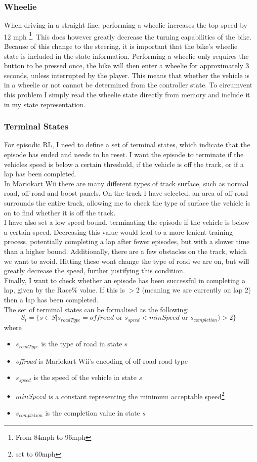 \subsubsection{Wheelie}
When driving in a straight line, performing a wheelie increases the top speed by 12 mph \footnote{From 84mph to 96mph}. This does however greatly decrease the turning capabilities of the bike. Because of this change to the steering, it is important that the bike's wheelie state is included in the state information. Performing a wheelie only requires the button to be pressed once, the bike will then enter a wheelie for approximately 3 seconds, unless interrupted by the player. This means that whether the vehicle is in a wheelie or not cannot be determined from the controller state. To circumvent this problem I simply read the wheelie state directly from memory and include it in my state representation.
\subsubsection{Terminal States}
\label{sec:terminal-states}
For episodic RL, I need to define a set of terminal states, which indicate that the episode has ended and needs to be reset. I want the episode to terminate if the vehicles speed is below a certain threshold, if the vehicle is off the track, or if a lap has been completed.\\In Mariokart Wii there are many different types of track surface, such as normal road, off-road and boost panels. On the track I have selected, an area of off-road surrounds the entire track, allowing me to check the type of surface the vehicle is on to find whether it is off the track.\\I have also set a low speed bound, terminating the episode if the vehicle is below a certain speed. Decreasing this value would lead to a more lenient training process, potentially completing a lap after fewer episodes, but with a slower time than a higher bound. Additionally, there are a few obstacles on the track, which we want to avoid. Hitting these wont change the type of road we are on, but will greatly decrease the speed, further justifying this condition.\\Finally, I want to check whether an episode has been successful in completing a lap, given by the Race\% value. If this is $>2$ (meaning we are currently on lap 2) then a lap has been completed. \\The set of terminal states can be formalised as the following:
\[ S_t = \{s \in S | s_{roadType} =  \textit{offroad}\text{ or } s_{speed} < minSpeed \text{ or } s_{completion}) >2\}\]
where
\begin{itemize}
    \item $s_{roadType}$ is the type of road in state $s$
    \item \textit{offroad} is Mariokart Wii's encoding of off-road road type
    \item $s_{speed}$ is the speed of the vehicle in state $s$
    \item $minSpeed$ is a constant representing the minimum acceptable speed\footnote{set to 60mph}
    \item $s_{completion}$ is the completion value in state $s$
\end{itemize}
